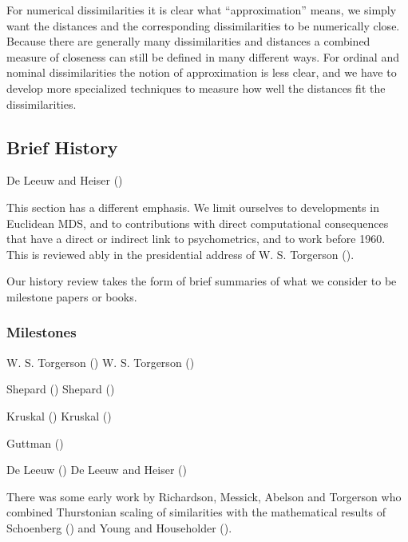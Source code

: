 \documentclass[
  12pt,
  letterpaper,
  DIV=11,
  numbers=noendperiod]{scrartcl}
\begin{document}
For numerical dissimilarities it is clear what ``approximation'' means,
we simply want the distances and the corresponding dissimilarities to be
numerically close. Because there are generally many dissimilarities and
distances a combined measure of closeness can still be defined in many
different ways. For ordinal and nominal dissimilarities the notion of
approximation is less clear, and we have to develop more specialized
techniques to measure how well the distances fit the dissimilarities.

\subsection{Brief History}\label{introhist}

De Leeuw and Heiser ()

This section has a different emphasis. We limit ourselves to
developments in Euclidean MDS, and to contributions with direct
computational consequences that have a direct or indirect link to
psychometrics, and to work before 1960. This is reviewed ably in the
presidential address of W. S. Torgerson
().

Our history review takes the form of brief summaries of what we consider
to be milestone papers or books.

\subsubsection{Milestones}\label{milestones}

W. S. Torgerson () W. S. Torgerson
()

Shepard () Shepard
()

Kruskal () Kruskal
()

Guttman ()

De Leeuw () De Leeuw and Heiser
()

There was some early work by Richardson, Messick, Abelson and Torgerson
who combined Thurstonian scaling of similarities with the mathematical
results of Schoenberg () and Young and
Householder ().
\end{document}

